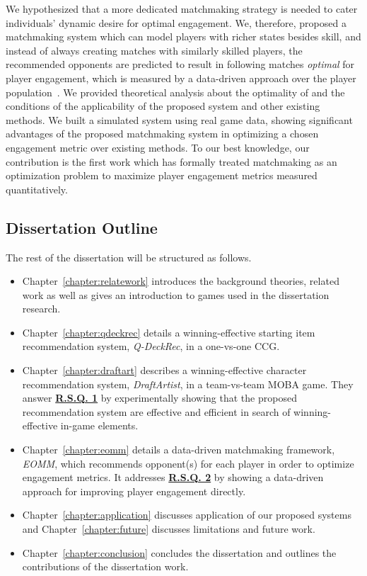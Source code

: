 We hypothesized that a more dedicated matchmaking strategy is needed to cater individuals' dynamic desire for optimal engagement. We, therefore, proposed a matchmaking system which can model players with richer states besides skill, and instead of always creating matches with similarly skilled players, the recommended opponents are predicted to result in following matches \textit{optimal} for player engagement, which is measured by a data-driven approach over the  player population~\citep{chen2017eomm}. We provided theoretical analysis about the optimality of and the conditions of the applicability of the proposed system and other existing methods. We built a simulated system using real game data, showing significant advantages of the proposed matchmaking system in optimizing a chosen engagement metric over existing methods. To our best knowledge, our contribution is the first work which has formally treated matchmaking as an optimization problem to maximize player engagement metrics measured quantitatively. 





\subsection{Dissertation Outline}
The rest of the dissertation will be structured as follows. 
\begin{itemize}
\item Chapter~\ref{chapter:relatework} introduces the background theories, related work as well as gives an introduction to games used in the dissertation research. 
\item Chapter~\ref{chapter:qdeckrec}  details a winning-effective starting item recommendation system,  \textit{Q-DeckRec}, in a one-vs-one CCG. 
\item Chapter~\ref{chapter:draftart} describes a winning-effective character recommendation system, \textit{DraftArtist}, in a team-vs-team MOBA game. They answer 
\hyperref[rq1]{\textbf{R.S.Q. 1}} by experimentally showing that the proposed recommendation system are effective and efficient in search of winning-effective in-game elements. 
\item Chapter~\ref{chapter:eomm} details a data-driven matchmaking framework, \textit{EOMM}, which recommends opponent(s) for each player in order to optimize engagement metrics. It addresses \hyperref[rq2]{\textbf{R.S.Q. 2}} by showing a data-driven approach for improving player engagement directly.

\item Chapter~\ref{chapter:application} discusses application of our proposed systems and Chapter~\ref{chapter:future} discusses limitations and future work.
\item Chapter~\ref{chapter:conclusion} concludes the dissertation and outlines the contributions of the dissertation work.
\end{itemize}



